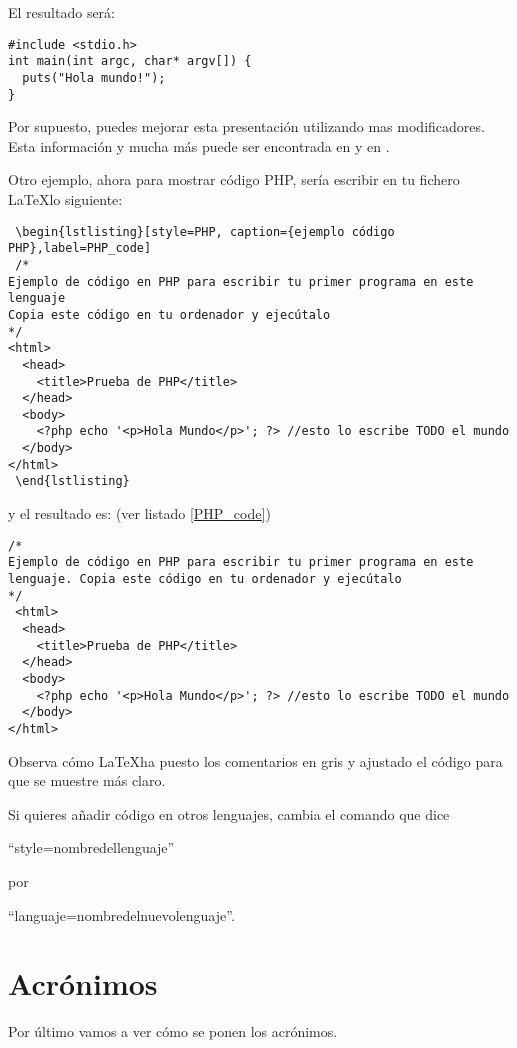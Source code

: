 El resultado será:
\begin{lstlisting}[style=C, caption={ejemplo código C},label=C_code]
#include <stdio.h>
int main(int argc, char* argv[]) {
  puts("Hola mundo!");
}
\end{lstlisting}

Por supuesto, puedes mejorar esta presentación utilizando mas modificadores. Esta información y mucha más puede ser encontrada en \cite{listing_packagge} y en \cite{heinz1listings}.

Otro ejemplo, ahora para mostrar código PHP, sería escribir en tu fichero \LaTeX lo siguiente:
\begin{verbatim}
 \begin{lstlisting}[style=PHP, caption={ejemplo código PHP},label=PHP_code]
 /* 
Ejemplo de código en PHP para escribir tu primer programa en este lenguaje
Copia este código en tu ordenador y ejecútalo
*/
<html>
  <head>
    <title>Prueba de PHP</title>
  </head>
  <body>
    <?php echo '<p>Hola Mundo</p>'; ?> //esto lo escribe TODO el mundo
  </body>
</html>
 \end{lstlisting}
\end{verbatim}
 
 y el resultado es: (ver listado \ref{PHP_code})
 
 \begin{lstlisting}[style=PHP, caption={ejemplo código PHP},label=PHP_code]
/* 
Ejemplo de código en PHP para escribir tu primer programa en este lenguaje. Copia este código en tu ordenador y ejecútalo
*/
 <html>
  <head>
    <title>Prueba de PHP</title>
  </head>
  <body>
    <?php echo '<p>Hola Mundo</p>'; ?> //esto lo escribe TODO el mundo
  </body>
</html>
 \end{lstlisting}
 
 Observa cómo \LaTeX ha puesto los comentarios en gris y ajustado el código para que se muestre más claro.
 
 Si quieres añadir código en otros lenguajes, cambia el comando que dice 
 
 \begin{center}
 ``style=nombredellenguaje''
 
  por 
 
 ``languaje=nombredelnuevolenguaje''.
 \end{center}
 
 \section{Acrónimos}
 Por último vamos a ver cómo se ponen los acrónimos.
 

